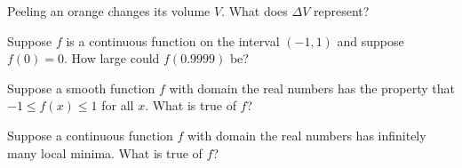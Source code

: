 \documentclass{ximera}
\newcommand{\recommendation}[1]{}
\newcommand{\GoodQuestions}[1]{}
\begin{document}
\begin{shuffle}
\begin{problem}
  \recommendation{Vic}
  \GoodQuestions{Subject: Linear approximation 7Q}
  
  Peeling an orange changes its volume $V$.  What does $\Delta V$
  represent?  
  \begin{multipleChoice}
  \end{multipleChoice}
\end{problem}




\begin{problem}
  Suppose $f$ is a continuous function on the interval $(-1,1)$ and suppose $f(0) = 0$.  How large could $f(0.9999)$ be?
  \begin{multipleChoice}
  \end{multipleChoice}
\end{problem}

\begin{problem}
  Suppose a smooth function $f$ with domain the real numbers has the property that $-1 \leq f(x) \leq 1$ for all $x$.  What is true of $f$?
  \begin{multipleChoice}
  \end{multipleChoice}
\end{problem}

\begin{problem}
  Suppose a continuous function $f$ with domain the real numbers has infinitely many local minima.  What is true of $f$?
  \begin{multipleChoice}
  \end{multipleChoice}
\end{problem}


\end{shuffle}
\end{document}
